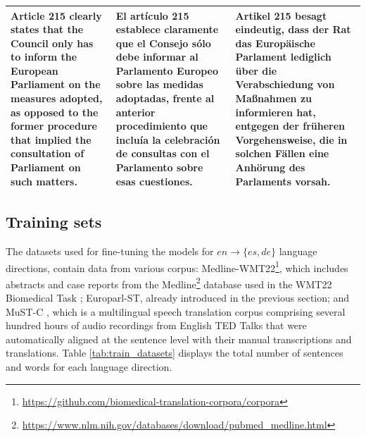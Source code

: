 \documentclass[11pt,english,listoffigures,listoftables]{tfgetsinf}
\begin{document}
\begin{table}[]
\begin{tabular}{p{5cm} | p{5cm} | p{5cm}}
         \hline
         Article 215 clearly states that the Council only has to inform the European Parliament on the measures adopted, as opposed to the former procedure that implied the consultation of Parliament on such matters. & El artículo 215 establece claramente que el Consejo sólo debe informar al Parlamento Europeo sobre las medidas adoptadas, frente al anterior procedimiento que incluía la celebración de consultas con el Parlamento sobre esas cuestiones. & Artikel 215 besagt eindeutig, dass der Rat das Europäische Parlament lediglich über die Verabschiedung von Maßnahmen zu informieren hat, entgegen der früheren Vorgehensweise, die in solchen Fällen eine Anhörung des Parlaments vorsah. \\
         \hline
    \end{tabular}
\end{table}

\subsection{Training sets}
\label{sec:training_sets}

The datasets used for fine-tuning the models for $en \rightarrow \{es, de\}$ language directions, contain data from various corpus: Medline-WMT22\footnote{\url{https://github.com/biomedical-translation-corpora/corpora}}, which includes abstracts and case reports from the Medline\footnote{\url{https://www.nlm.nih.gov/databases/download/pubmed_medline.html}} database used in the WMT22 Biomedical Task \cite{neves-etal-2022-wmt22-medical}; Europarl-ST, already introduced in the previous section; and MuST-C \cite{di-gangi-etal-2019-mustc}, which is a multilingual speech translation corpus comprising several hundred hours of audio recordings from English TED Talks that were automatically aligned at the sentence level with their manual transcriptions and translations. Table \ref{tab:train_datasets} displays the total number of sentences and words for each language direction.

\begin{table}[h]
    \centering
    \caption{Training corpora for $ en \rightarrow es, de $ language pairs.}
    \label{tab:train_datasets}
\end{table}
\end{document}
